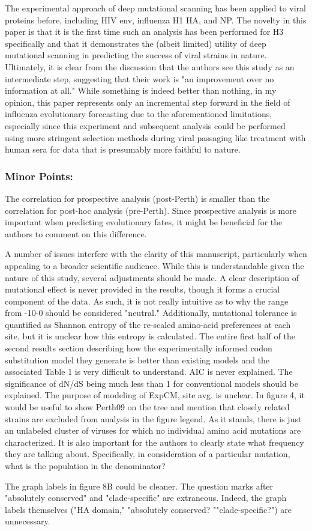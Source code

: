 \documentclass[11pt, oneside]{article}   	%
\begin{document}
The experimental approach of deep mutational scanning has been applied to viral proteins before, including HIV env, influenza H1 HA, and NP. The novelty in this paper is that it is the first time such an analysis has been performed for H3 specifically and that it demonstrates the (albeit limited) utility of deep mutational scanning in predicting the success of viral strains in nature. Ultimately, it is clear from the discussion that the authors see this study as an intermediate step, suggesting that their work is "an improvement over no information at all." While something is indeed better than nothing, in my opinion, this paper represents only an incremental step forward in the field of influenza evolutionary forecasting due to the aforementioned limitations, especially since this experiment and subsequent analysis could be performed using more stringent selection methods during viral passaging like treatment with human sera for data that is presumably more faithful to nature. 

\subsubsection*{Minor Points:} 

The correlation for prospective analysis (post-Perth) is smaller than the correlation for post-hoc analysis (pre-Perth). Since prospective analysis is more important when predicting evolutionary fates, it might be beneficial for the authors to comment on this difference. 

A number of issues interfere with the clarity of this manuscript, particularly when appealing to a broader scientific audience. While this is understandable given the nature of this study, several adjustments should be made. A clear description of mutational effect is never provided in the results, though it forms a crucial component of the data. As such, it is not really intuitive as to why the range from -10-0 should be considered "neutral." Additionally, mutational tolerance is quantified as Shannon entropy of the re-scaled amino-acid preferences at each site, but it is unclear how this entropy is calculated. The entire first half of the second results section describing how the experimentally informed codon substitution model they generate is better than existing models and the associated Table 1 is very difficult to understand. AIC is never explained. The significance of dN/dS being much less than 1 for conventional models should be explained. The purpose of modeling of ExpCM, site avg. is unclear. 
In figure 4, it would be useful to show Perth09 on the tree and mention that closely related strains are excluded from analysis in the figure legend. As it stands, there is just an unlabeled cluster of viruses for which no individual amino acid mutations are characterized. It is also important for the authors to clearly state what frequency they are talking about. Specifically, in consideration of a particular mutation, what is the population in the denominator? 

The graph labels in figure 8B could be cleaner. The question marks after "absolutely conserved" and "clade-specific" are extraneous. Indeed, the graph labels themselves ("HA domain," "absolutely conserved? ""clade-specific?") are unnecessary. 
\end{document}
